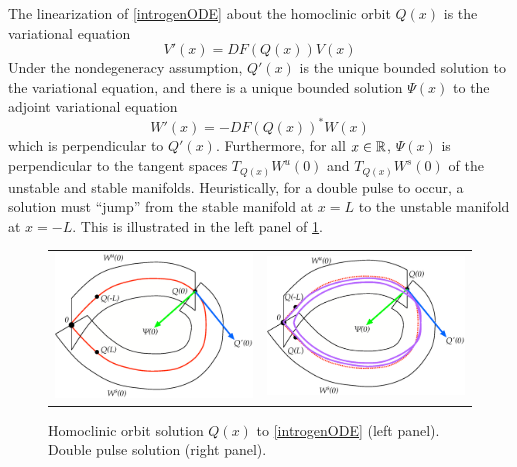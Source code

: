 \documentclass[thesis2.tex]{subfiles}
\begin{document}
The linearization of \cref{introgenODE} about the homoclinic orbit $Q(x)$ is the variational equation
\begin{equation}\label{introvareq}
V'(x) = DF(Q(x)) V(x)
\end{equation}
Under the nondegeneracy assumption, $Q'(x)$ is the unique bounded solution to the variational equation, and there is a unique bounded solution $\Psi(x)$ to the adjoint variational equation
\begin{equation}\label{introadjvareq}
W'(x) = -DF(Q(x))^* W(x)
\end{equation}
which is perpendicular to $Q'(x)$. Furthermore, for all $x \in \mathbb{R}$, $\Psi(x)$ is perpendicular to the tangent spaces $T_{Q(x)}W^u(0)$ and $T_{Q(x)}W^s(0)$ of the unstable and stable manifolds. Heuristically, for a double pulse to occur, a solution must ``jump'' from the stable manifold at $x = L$ to the unstable manifold at $x = -L$. This is illustrated in the left panel of \cref{fig:wswu}.
\begin{figure}
\begin{center}
\begin{tabular}{cc}
\includegraphics[width=8cm]{images/intro/WsWu} &
\includegraphics[width=8cm]{images/intro/WsWuDouble}
\end{tabular}
\caption[Homoclinic orbit and double pulse]{Homoclinic orbit solution $Q(x)$ to \cref{introgenODE} (left panel). Double pulse solution (right panel). }
\label{fig:wswu}
\end{center}
\end{figure}
\end{document}
